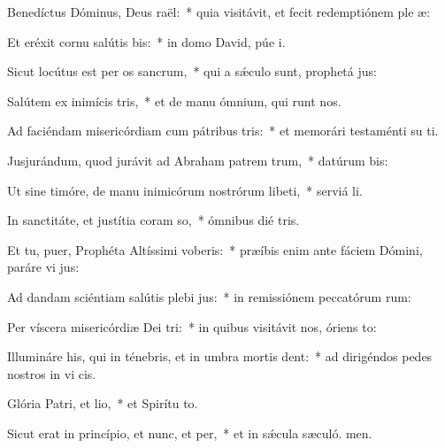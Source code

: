 \item Benedíctus Dóminus, Deus raël:~* quia visitávit, et fecit redemptiónem ple æ:
\item Et eréxit cornu salútis bis:~* in domo David, púe i.
\item Sicut locútus est per os sancrum,~* qui a sǽculo sunt, prophetá jus:
\item Salútem ex inimícis tris,~* et de manu ómnium, qui runt nos.
\item Ad faciéndam misericórdiam cum pátribus tris:~* et memorári testaménti su ti.
\item Jusjurándum, quod jurávit ad Abraham patrem trum,~* datúrum  bis:
\item Ut sine timóre, de manu inimicórum nostrórum libeti,~* serviá li.
\item In sanctitáte, et justítia coram so,~* ómnibus dié tris.
\item Et tu, puer, Prophéta Altíssimi voberis:~* præíbis enim ante fáciem Dómini, paráre vi jus:
\item Ad dandam sciéntiam salútis plebi jus:~* in remissiónem peccatórum rum:
\item Per víscera misericórdiæ Dei tri:~* in quibus visitávit nos, óriens  to:
\item Illumináre his, qui in ténebris, et in umbra mortis dent:~* ad dirigéndos pedes nostros in vi cis.
\item Glória Patri, et lio,~* et Spirítu to.
\item Sicut erat in princípio, et nunc, et per,~* et in sǽcula sæculó. men.
